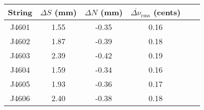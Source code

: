 \begin{tabular}{cccccc}
\toprule
String & $\Delta S$ (mm) & $\Delta N$ (mm) & $\overline{\Delta \nu}_\text{rms}$ (cents) \\
\midrule
J4601 & 1.55 & -0.35 & 0.16 \\
J4602 & 1.87 & -0.39 & 0.18 \\
J4603 & 2.39 & -0.42 & 0.19 \\
J4604 & 1.59 & -0.34 & 0.16 \\
J4605 & 1.93 & -0.36 & 0.17 \\
J4606 & 2.40 & -0.38 & 0.18 \\
\bottomrule
\end{tabular}

